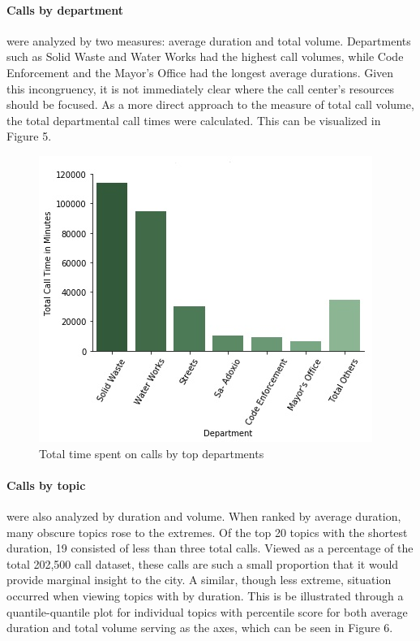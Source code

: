 \documentclass[12pt]{article}
\begin{document}
\paragraph{Calls by department} were analyzed by two measures:  average duration and total volume.  Departments such as Solid Waste and Water Works had the highest call volumes, while Code Enforcement and the Mayor's Office had the longest average durations.  Given this incongruency, it is not immediately clear where the call center's resources should be focused.  As a more direct approach to the measure of total call volume, the total departmental call times were calculated.  This can be visualized in Figure 5.

	\begin{figure}
	\includegraphics[scale=.4]{InkedCalls_Department_sim_LI.jpg}
	\caption{Total time spent on calls by top departments}
	\end{figure}

\paragraph{Calls by topic} were also analyzed by duration and volume.  When ranked by average duration, many obscure topics rose to the extremes.  Of the top 20 topics with the shortest duration, 19 consisted of less than three total calls.  Viewed as a percentage of the total 202,500 call dataset, these calls are such a small proportion that it would provide marginal insight to the city.  A similar, though less extreme, situation occurred when viewing topics with by duration.  This is be illustrated through a quantile-quantile plot for individual topics with percentile score for both average duration and total volume serving as the axes, which can be seen in Figure 6.
\end{document}
